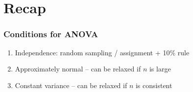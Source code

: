 \documentclass[11pt,containsverbatim,handout]{beamer}
\begin{document}

\begin{frame}
\frametitle{}

\vfill


\vfill

\end{frame}



\begin{frame}
\frametitle{}

\vfill


\vfill

\end{frame}


\section{Recap}


\begin{frame}
\frametitle{Conditions for ANOVA}

\begin{enumerate}

\item Independence: random sampling / assignment + 10\% rule

\item Approximately normal -- can be relaxed if $n$ is large

\item Constant variance -- can be relaxed if $n$ is consistent

\end{enumerate}

\end{frame}

\end{document}
